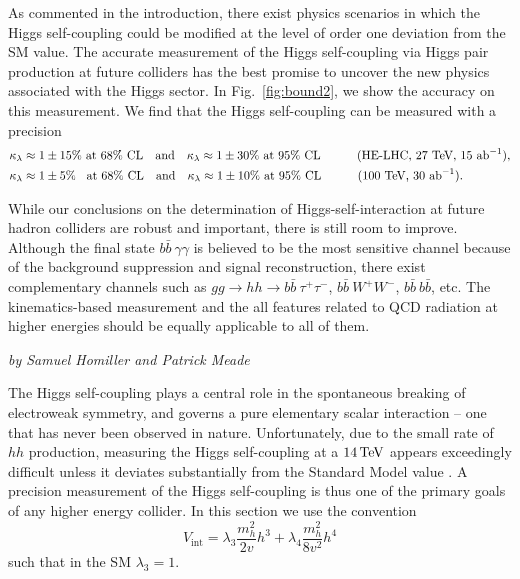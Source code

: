 As commented in the introduction, there exist physics scenarios in which the Higgs self-coupling could be modified at the level of order one deviation from the SM value. The accurate measurement of the Higgs self-coupling via Higgs pair production at future colliders has the best promise to uncover the new physics associated with the Higgs sector. In Fig.~\ref{fig:bound2}, we show the accuracy on this measurement. We find that the Higgs self-coupling can be measured with a precision
% 
\begin{align}
\kappa_{\lambda} &\approx 1 \pm 15\% \text{    at 68\% CL}\quad \text{and} \quad
\kappa_{\lambda} \approx 1 \pm 30\%   \text{    at 95\% CL}\quad\quad\quad
\text{(HE-LHC, 27~TeV, $15~\text{ab}^{-1}$)}  , \notag \\
\kappa_{\lambda} &\approx 1 \pm 5\% \;\; \text{    at 68\% CL}\quad \text{and}\quad
\kappa_{\lambda} \approx 1 \pm 10\% \text{    at 95\% CL} \quad\quad\quad
\text{(100~TeV, $30~\text{ab}^{-1}$).} 
\end{align}

While our conclusions on the determination of Higgs-self-interaction
at future hadron colliders are robust and important, there is still
room to improve. Although the final state $b\bar b\ \gamma\gamma$ is
believed to be the most sensitive channel because of the background
suppression and signal reconstruction, there exist complementary
channels such as ${gg\to hh \to b\bar b\ \tau^+\tau^-}$, $b\bar
b\ W^+W^-$, $b\bar b\ b\bar b$, etc. The kinematics-based measurement
and the all features related to QCD radiation at higher energies
should be equally applicable to all of them.


\begin{center}
\textit{by Samuel Homiller and Patrick Meade}
\end{center}

The Higgs self-coupling plays a central role in the spontaneous breaking of electroweak symmetry, and governs a pure elementary scalar interaction -- one that has never been observed in nature. Unfortunately, due to the small rate of $hh$ production, measuring the Higgs self-coupling at a $14\, {\rm TeV}$ appears exceedingly difficult unless it deviates substantially from the Standard Model value \cite{ATL-PHYS-PUB-2014-019, ATL-PHYS-PUB-2017-001}. A precision measurement of the Higgs self-coupling is thus one of the primary goals of any higher energy collider.  In this section we use the convention
\begin{equation}\label{eq:v_int}
  V_{\text{int}} = \lambda_3\frac{m_h^2}{2v}h^3 + \lambda_4\frac{m_h^2}{8v^2}h^4
\end{equation}
such that in the SM $\lambda_3=1$.

